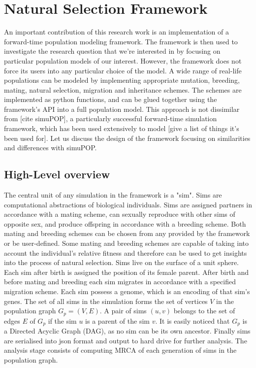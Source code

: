 \documentclass{l4proj}
\begin{document}
\section{Natural Selection Framework}
An important contribution of this research work is an implementation of a forward-time population modeling framework. The framework is then used to investigate the research question that we're interested in by focusing on particular population models of our interest. However, the framework does not force its users into any particular choice of the model. A wide range of real-life populations can be modeled by implementing appropriate mutation, breeding, mating, natural selection, migration and inheritance schemes. The schemes are implemented as python functions, and can be glued together using the framework's API into a full population model. This approach is not dissimilar from [cite simuPOP], a particularly successful forward-time simulation framework, which has been used extensively to model [give a list of things it's been used for]. Let us discuss the design of the framework focusing on similarities and differences with simuPOP.

\subsection{High-Level overview}
The central unit of any simulation in the framework is a "sim". Sims are computational abstractions of biological individuals. Sims are assigned partners in accordance with a mating scheme, can sexually reproduce with other sims of opposite sex, and produce offspring in accordance with a breeding scheme. Both mating and breeding schemes can be chosen from any provided by the framework or be user-defined. Some mating and breeding schemes are capable of taking into account the individual's relative fitness and therefore can be used to get insights into the process of natural selection. Sims live on the surface of a unit sphere. Each sim after birth is assigned the position of its female parent. After birth and before mating and breeding each sim migrates in accordance with a specified migration scheme. Each sim possess a genome, which is an encoding of that sim's genes. The set of all sims in the simulation forms the set of vertices $V$ in the population graph $G_{p} = (V, E)$. A pair of sims $(u, v)$ belongs to the set of edges $E$ of $G_{p}$ if the sim $u$ is a parent of the sim $v$. It is easily noticed that $G_{p}$ is a Directed Acyclic Graph (DAG), as no sim can be its own ancestor. Finally sims are serialised into json format and output to hard drive for further analysis. The analysis stage consists of computing MRCA of each generation of sims in the population graph.
\end{document}

